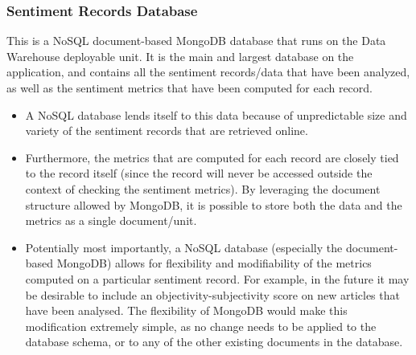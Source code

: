 \documentclass[12pt]{article}
\begin{document}
\subsubsection{Sentiment Records Database}
This is a NoSQL document-based MongoDB database that runs on the Data Warehouse deployable unit. It is the main and largest database on the application, and contains all the sentiment records/data that have been analyzed, as well as the sentiment metrics that have been computed for each record.
\begin{itemize}
    \item A NoSQL database lends itself to this data because of unpredictable size and variety of the sentiment records that are retrieved online.
    \item Furthermore, the metrics that are computed for each record are closely tied to the record itself (since the record will never be accessed outside the context of checking the sentiment metrics). By leveraging the document structure allowed by MongoDB, it is possible to store both the data and the metrics as a single document/unit.
    \item Potentially most importantly, a NoSQL database (especially the document-based MongoDB) allows for flexibility and modifiability of the metrics computed on a particular sentiment record. For example, in the future it may be desirable to include an objectivity-subjectivity score on new articles that have been analysed. The flexibility of MongoDB would make this modification extremely simple, as no change needs to be applied to the database schema, or to any of the other existing documents in the database.
\end{itemize}
\end{document}
